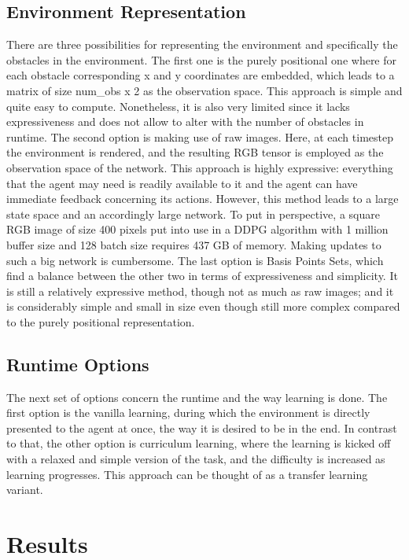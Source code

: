 \documentclass[conference]{IEEEtran}
\begin{document}
\subsection{Environment Representation}

There are three possibilities for representing the environment and specifically the obstacles in the environment. The first one is the purely positional one where for each obstacle corresponding x and y coordinates are embedded, which leads to a matrix of size num\_obs x 2 as the observation space. This approach is simple and quite easy to compute. Nonetheless, it is also very limited since it lacks expressiveness and does not allow to alter with the number of obstacles in runtime. 
The second option is making use of raw images. Here, at each timestep the environment is rendered, and the resulting RGB tensor is employed as the observation space of the network. This approach is highly expressive: everything that the agent may need is readily available to it and the agent can have immediate feedback concerning its actions. However, this method leads to a large state space and an accordingly large network. To put in perspective, a square RGB image of size 400 pixels put into use in a DDPG algorithm with 1 million buffer size and 128 batch size requires 437 GB of memory. Making updates to such a big network is cumbersome. 
The last option is Basis Points Sets, which find a balance between the other two in terms of expressiveness and simplicity. It is still a relatively expressive method, though not as much as raw images; and it is considerably simple and small in size even though still more complex compared to the purely positional representation.

\subsection{Runtime Options}

The next set of options concern the runtime and the way learning is done. The first option is the vanilla learning, during which the environment is directly presented to the agent at once, the way it is desired to be in the end. In contrast to that, the other option is curriculum learning, where the learning is kicked off with a relaxed and simple version of the task, and the difficulty is increased as learning progresses. This approach can be thought of as a transfer learning variant.

\section{Results}
\end{document}
